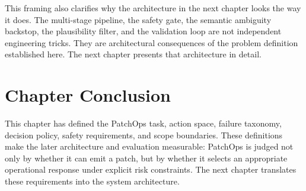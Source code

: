 This framing also clarifies why the architecture in the next chapter looks the way it does. The multi-stage
pipeline, the safety gate, the semantic ambiguity backstop, the plausibility filter, and the validation loop are
not independent engineering tricks. They are architectural consequences of the problem definition established
here. The next chapter presents that architecture in detail.

\section{Chapter Conclusion}

This chapter has defined the PatchOps task, action space, failure taxonomy, decision policy, safety
requirements, and scope boundaries. These definitions make the later architecture and evaluation measurable:
PatchOps is judged not only by whether it can emit a patch, but by whether it selects an appropriate operational
response under explicit risk constraints. The next chapter translates these requirements into the system
architecture.
